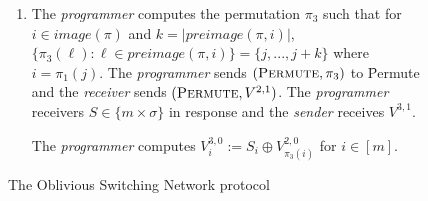 \begin{figure}[ht]
{\begin{minipage}{0.95\linewidth}
\begin{enumerate}
\begin{enumerate}
					\item The \emph{programmer} computes the permutation $\pi_3$ such that for  $i\in image(\pi)$ and $k=|preimage(\pi, i)|$, $\{\pi_3(\ell) : \ell\in preimage(\pi, i)\}=\{j, ..., j +k\}$ where $i=\pi_1(j)$.	The \emph{programmer} sends $(\textsc{Permute}, \pi_3)$ to \f{Permute} and the \emph{receiver} sends $(\textsc{Permute}, V^{2,1})$.  The \emph{programmer} receivers $S\in \{m\times \sigma \}$ in response and the \emph{sender} receives $V^{3,1}$.
					
					The \emph{programmer} computes $V^{3,0}_i:=S_i\oplus V^{2,0}_{\pi_3(i)}$ for $i\in [m]$.
				\end{enumerate}
			\end{enumerate}
	\end{minipage}}
	\caption{The Oblivious Switching Network protocol }
	\label{fig:switching-net}	
\end{figure}